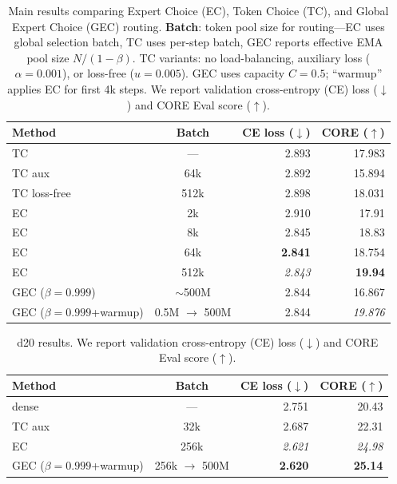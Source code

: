 \documentclass{article}
\theoremstyle{plain}
\theoremstyle{definition}
\theoremstyle{remark}
\begin{document}
\begin{table}[t]
\centering
\caption{Main results comparing Expert Choice (EC), Token Choice (TC), and Global Expert Choice (GEC) routing. \textbf{Batch}: token pool size for routing—EC uses global selection batch, TC uses per-step batch, GEC reports effective EMA pool size $N/(1-\beta)$. TC variants: no load-balancing, auxiliary loss ($\alpha{=}0.001$), or loss-free ($u{=}0.005$). GEC uses capacity $C{=}0.5$; ``warmup'' applies EC for first 4k steps. We report validation cross-entropy (CE) loss ($\downarrow$) and CORE Eval score ($\uparrow$).}
\label{tab:main_results}
\small
\setlength{\tabcolsep}{4pt}
\begin{tabularx}{\columnwidth}{@{}>{\raggedright\arraybackslash}X c r r@{}}
\toprule
\textbf{Method} & \textbf{Batch} & \textbf{CE loss ($\downarrow$)} & \textbf{CORE ($\uparrow$)} \\
\midrule
TC  & --- &  2.893 & 17.983 \\
TC aux & 64k & 2.892 & 15.894 \\
TC loss-free & 512k & 2.898 & 18.031 \\
\midrule
EC & 2k & 2.910 & 17.91 \\
EC & 8k & 2.845 & 18.83 \\
EC & 64k & \textbf{2.841} & 18.754 \\
EC & 512k & \textit{2.843} & \textbf{19.94} \\
\midrule
GEC ($\beta{=}0.999$) & $\sim$500M & 2.844 & 16.867 \\
GEC ($\beta{=}0.999$+warmup) & 0.5M $\rightarrow$ 500M & 2.844 & \textit{19.876} \\
\bottomrule
\end{tabularx}
\end{table}

\begin{table}[t]
\centering
\caption{d20 results. We report validation cross-entropy (CE) loss ($\downarrow$) and CORE Eval score ($\uparrow$).}
\label{tab:d20_results}
\small
\setlength{\tabcolsep}{4pt}
\begin{tabularx}{\columnwidth}{@{}>{\raggedright\arraybackslash}X c r r@{}}
\toprule
\textbf{Method} & \textbf{Batch} & \textbf{CE loss ($\downarrow$)} & \textbf{CORE ($\uparrow$)} \\
\midrule
dense & --- & 2.751 & 20.43 \\
TC aux & 32k & 2.687 & 22.31 \\
EC & 256k & \textit{2.621} & \textit{24.98} \\
GEC ($\beta{=}0.999$+warmup) & 256k $\rightarrow$ 500M & \textbf{2.620} & \textbf{25.14} \\
\bottomrule
\end{tabularx}
\end{table}
\end{document}
